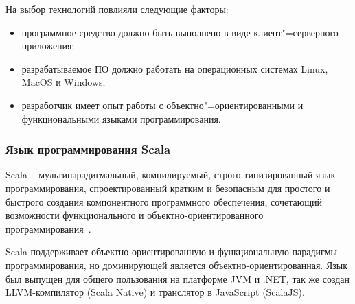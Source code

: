 На выбор технологий повлияли следующие факторы:
\begin{itemize}
  \item программное средство должно быть выполнено в виде клиент"=серверного приложения;
  \item разрабатываемое ПО должно работать на операционных системах Linux, MacOS и Windows;
  \item разработчик имеет опыт работы с объектно"=ориентированными и функциональными языками программирования.
\end{itemize}

\subsubsection{Язык программирования Scala}
\label{sub:techs:scala}
Scala – мультипарадигмальный, компилируемый, строго типизированный язык программирования, спроектированный кратким и безопасным для простого и быстрого создания компонентного программного обеспечения, сочетающий возможности функционального и объектно-ориентированного программирования~\cite{wiki_scala}.

Scala поддерживает объектно-ориентированную и функциональную парадигмы программирования, но доминирующей является объектно-ориентированная. Язык был выпущен для общего пользования на платформе JVM и .NET, так же создан LLVM-компилятор (Scala Native) и транслятор в JavaScript (ScalaJS).

